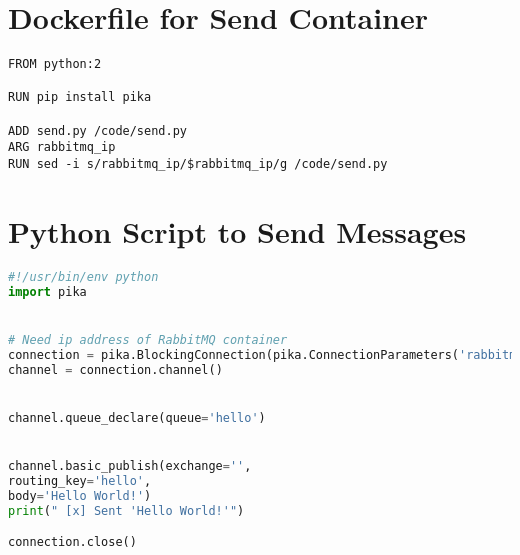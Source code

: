 \section{Dockerfile for Send Container} \label{send-dockerfile}
\begin{lstlisting}
FROM python:2

RUN pip install pika

ADD send.py /code/send.py
ARG rabbitmq_ip
RUN sed -i s/rabbitmq_ip/$rabbitmq_ip/g /code/send.py
\end{lstlisting}

\section{Python Script to Send Messages} \label{send-script}
\begin{lstlisting}[language=python]
#!/usr/bin/env python
import pika


# Need ip address of RabbitMQ container
connection = pika.BlockingConnection(pika.ConnectionParameters('rabbitmq_ip'))
channel = connection.channel()


channel.queue_declare(queue='hello')


channel.basic_publish(exchange='',
routing_key='hello',
body='Hello World!')
print(" [x] Sent 'Hello World!'")

connection.close()
\end{lstlisting}